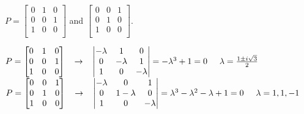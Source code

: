 \documentclass[10pt,twoside,reqno]{article}
\begin{document}
\begin{enumerate}
\begin{center}
$
P=
\begin{bmatrix}
0&1&0\\
0&0&1\\
1&0&0\\
\end{bmatrix}
$
\hspace{5mm} and \hspace{5mm}
$
\begin{bmatrix}
0&0&1\\
0&1&0\\
1&0&0\\
\end{bmatrix}
$. \\
\end{center}
\vspace{2mm}
\begin{center}
$
P=
\begin{bmatrix}
0&1&0\\
0&0&1\\
1&0&0\\
\end{bmatrix}
\hspace{3mm}
\rightarrow
\hspace{3mm}
\begin{vmatrix}
-\lambda&1&0\\
0&-\lambda&1\\
1&0&-\lambda\\
\end{vmatrix}
=-\lambda^3+1=0
\hspace{5mm}
\lambda=\frac{1 \pm i\sqrt{3}}{2}
$ \\
$
P=
\begin{bmatrix}
0&0&1\\
0&1&0\\
1&0&0\\
\end{bmatrix}
\hspace{3mm}
\rightarrow
\hspace{3mm}
\begin{vmatrix}
-\lambda&0&1\\
0&1-\lambda&0\\
1&0&-\lambda\\
\end{vmatrix}
=\lambda^3-\lambda^2-\lambda+1=0
\hspace{5mm}
\lambda=1,1,-1
$ \\
\end{center}


\end{enumerate}
\end{document}
